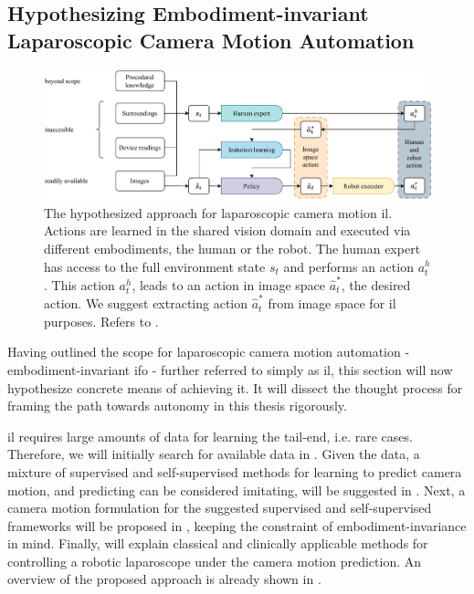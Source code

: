 \subsection{Hypothesizing Embodiment-invariant Laparoscopic Camera Motion Automation}
\label{in:sec:hypothesizing}
\begin{figure}[tb]
    \centering
    \includegraphics[width=\textwidth]{introduction/fig/camera_motion_action.pdf}
    \caption{The hypothesized approach for laparoscopic camera motion \gls{il}. Actions are learned in the shared vision domain and executed via different embodiments, the human or the robot. The human expert has access to the full environment state $s_t$ and performs an action $a^h_t$. This action $a^h_t$, leads to an action in image space $\hat{a}^*_t$, the desired action. We suggest extracting action $\hat{a}^*_t$ from image space for \gls{il} purposes. Refers to .}
    \label{in:fig:hypothesized_pipeline}
\end{figure}
Having outlined the scope for laparoscopic camera motion automation - embodiment-invariant \gls{ifo} - further referred to simply as \gls{il}, this section will now hypothesize concrete means of achieving it. It will dissect the thought process for framing the path towards autonomy in this thesis rigorously.

\gls{il} requires large amounts of data for learning the tail-end, i.e. rare cases. Therefore, we will initially search for available data in . Given the data, a mixture of supervised and self-supervised methods for learning to predict camera motion, and predicting can be considered imitating, will be suggested in . Next, a camera motion formulation for the suggested supervised and self-supervised frameworks will be proposed in , keeping the constraint of embodiment-invariance in mind. Finally,  will explain classical and clinically applicable methods for controlling a robotic laparoscope under the camera motion prediction.  An overview of the proposed approach is already shown in .

